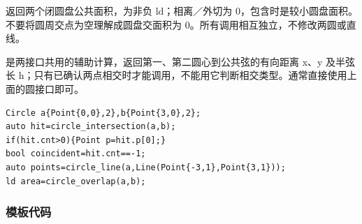  返回两个闭圆盘公共面积，为非负 ld；相离／外切为 0，包含时是较小圆盘面积。不要将圆周交点为空理解成圆盘交面积为 0。所有调用相互独立，不修改两圆或直线。

 是两接口共用的辅助计算，返回第一、第二圆心到公共弦的有向距离 x、y 及半弦长 h；只有已确认两点相交时才能调用，不能用它判断相交类型。通常直接使用上面的圆接口即可。
\begin{lstlisting}[style=mtycpp,numbers=none]
Circle a{Point{0,0},2},b{Point{3,0},2};
auto hit=circle_intersection(a,b);
if(hit.cnt>0){Point p=hit.p[0];}
bool coincident=hit.cnt==-1;
auto points=circle_line(a,Line(Point{-3,1},Point{3,1}));
ld area=circle_overlap(a,b);
\end{lstlisting}
\subsubsection*{模板代码}

